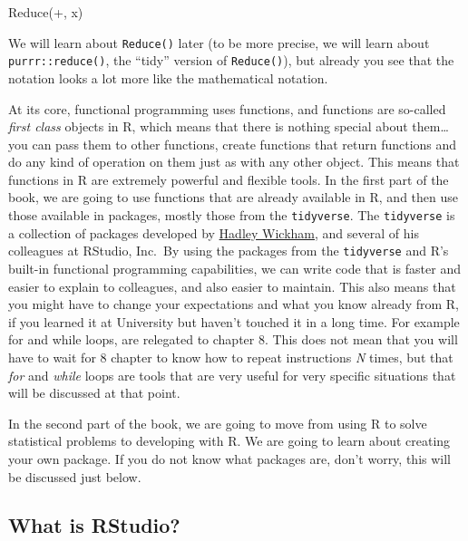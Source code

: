 \documentclass[
]{article}
\newenvironment{Shaded}{\begin{snugshade}}{\end{snugshade}}
\newcommand{\AttributeTok}[1]{\textcolor[rgb]{0.77,0.63,0.00}{#1}}
\newcommand{\FunctionTok}[1]{\textcolor[rgb]{0.00,0.00,0.00}{#1}}
\newcommand{\NormalTok}[1]{#1}
\newcommand{\StringTok}[1]{\textcolor[rgb]{0.31,0.60,0.02}{#1}}
\begin{document}
\begin{Shaded}
\begin{Highlighting}[]
\FunctionTok{Reduce}\NormalTok{(}\StringTok{\textasciigrave{}}\AttributeTok{+}\StringTok{\textasciigrave{}}\NormalTok{, x)}
\end{Highlighting}
\end{Shaded}

We will learn about \texttt{Reduce()} later (to be more precise, we will learn about \texttt{purrr::reduce()},
the ``tidy'' version of \texttt{Reduce()}), but already you see that the notation looks a lot more
like the mathematical notation.

At its core, functional programming uses functions, and functions are so-called \emph{first
class} objects in R, which means that there is nothing special about them\ldots{} you can pass them to
other functions, create functions that return functions and do any kind of operation on them just as
with any other object. This means that functions in R are extremely powerful and flexible tools.
In the first part of the book, we are going to use functions that are already available in R, and
then use those available in packages, mostly those from the \texttt{tidyverse}. The \texttt{tidyverse} is a
collection of packages developed by \href{http://hadley.nz/}{Hadley Wickham}, and several of his colleagues
at RStudio, Inc.~By using the packages from the \texttt{tidyverse} and R's built-in functional programming
capabilities, we can write code that is faster and easier to explain to colleagues, and also easier
to maintain. This also means that you might have to change your expectations and what you know
already from R, if you learned it at University but haven't touched it in a long time. For example
for and while loops, are relegated to chapter 8. This does not mean that you will have to wait for
8 chapter to know how to repeat instructions \emph{N} times, but that \emph{for} and \emph{while} loops are tools that
are very useful for very specific situations that will be discussed at that point.

In the second part of the book, we are going to move from using R to solve statistical problems to
developing with R. We are going to learn about creating your own package. If you do not know what
packages are, don't worry, this will be discussed just below.

\hypertarget{what-is-rstudio}{%
\subsection*{What is RStudio?}\label{what-is-rstudio}}
\end{document}
